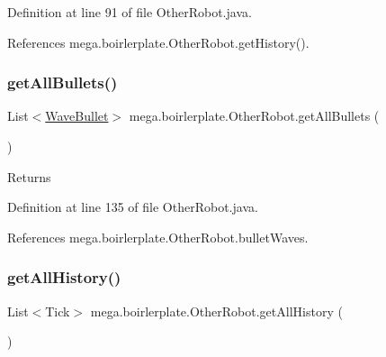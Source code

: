 Definition at line 91 of file Other\+Robot.\+java.



References mega.\+boirlerplate.\+Other\+Robot.\+get\+History().

\mbox{\label{classmega_1_1boirlerplate_1_1_other_robot_a81838897cfc98e26f34a63d6fe857878}} 
\subsubsection{\texorpdfstring{get\+All\+Bullets()}{getAllBullets()}}
{\footnotesize\ttfamily List$<$\hyperlink{classmega_1_1boirlerplate_1_1_wave_bullet}{Wave\+Bullet}$>$ mega.\+boirlerplate.\+Other\+Robot.\+get\+All\+Bullets (\begin{DoxyParamCaption}{ }\end{DoxyParamCaption})}

\begin{DoxyReturn}{Returns}

\end{DoxyReturn}


Definition at line 135 of file Other\+Robot.\+java.



References mega.\+boirlerplate.\+Other\+Robot.\+bullet\+Waves.

\mbox{\label{classmega_1_1boirlerplate_1_1_other_robot_a583b11b6b1dfa1286f708aaa29db105b}} 
\subsubsection{\texorpdfstring{get\+All\+History()}{getAllHistory()}}
{\footnotesize\ttfamily List$<$Tick$>$ mega.\+boirlerplate.\+Other\+Robot.\+get\+All\+History (\begin{DoxyParamCaption}{ }\end{DoxyParamCaption})}

